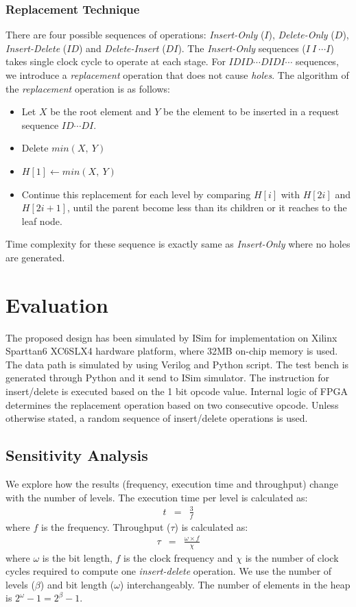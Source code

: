 \documentclass[10pt, conference, compsocconf]{IEEEtran}
\begin{document}
\subsubsection{Replacement Technique}
 There are four possible sequences of operations: {\it Insert-Only} ($I$), {\it Delete-Only} ($D$), {\it Insert-Delete} ($ID$) and {\it Delete-Insert} ($DI$).
The {\it Insert-Only} sequences ($I \ I \ \cdots I $) takes single clock cycle to operate at each stage.
For $IDID \cdots DIDI \cdots$ sequences, we introduce a {\it replacement} operation that does not cause {\it holes}.
The algorithm of the {\it replacement} operation is as follows:
 \begin{itemize}
 \item Let $X$ be the root element and $Y$ be the element to be inserted in a request sequence $ID \cdots DI$.
 \item Delete $min(X, \ Y)$
 \item $H[1] \leftarrow min(X,\ Y)$
 \item Continue this replacement for each level by comparing $H[i]$ with $H[2i]$ and $H[2i+1]$, until the parent become less than its children or it reaches to the leaf node.
 \end{itemize}
Time complexity for these sequence is exactly same as {\it Insert-Only} where no holes are generated.

\section{Evaluation}

The proposed design has been simulated by ISim for implementation on Xilinx Sparttan6 XC6SLX4 hardware platform, where 32MB on-chip memory is used.
The data path is simulated by using Verilog and Python script.
The test bench is generated through Python and it send to ISim simulator.
The instruction for insert/delete is executed based on the 1 bit opcode value.
Internal logic of FPGA determines the replacement operation based on two consecutive opcode.
Unless otherwise stated, a random sequence of insert/delete operations is used.

\subsection{Sensitivity Analysis}

We explore how the results (frequency, execution time and throughput) change with the number of levels.
The execution time per level is calculated as:
\begin{eqnarray}
t &=&  \frac{3}{f}
\end{eqnarray}
where $f$ is the frequency.
Throughput ($\tau$) is calculated as:
\begin{eqnarray}
\tau &=&  \frac{\omega \times  f}{\chi}
\end{eqnarray}
 where $\omega$ is the bit length, $f$ is the clock frequency and $\chi$ is the number of clock cycles required to compute one {\it insert-delete} operation.
We use the number of levels ($\beta$) and bit length ($\omega$) interchangeably.
The number of elements in the heap is $2^\omega-1 = 2^\beta -1$.
\end{document}
